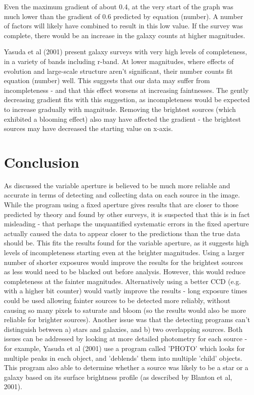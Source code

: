 \documentclass[a4paper,11pt,twoside]{article}
\begin{document}
Even the maximum gradient of about 0.4, at the very start of the graph was much lower than the gradient of 0.6 predicted by equation (number). A number of factors will likely have combined to result in this low value. If the survey was complete, there would be an increase in the galaxy counts at higher magnitudes.


Yasuda\cite{yasuda} et al (2001) present galaxy surveys with very high levels of completeness, in a variety of bands including r-band. At lower magnitudes, where effects of evolution and large-scale structure aren't significant, their number counts fit equation (number) well. 
This suggests that our data may suffer from incompleteness - and that this effect worsens at increasing faintnesses.
The gently decreasing gradient fits with this suggestion, as incompleteness would be expected to  increase gradually with magnitude.
Removing the brightest sources (which exhibited a blooming effect) also may have affected the gradient - the brightest sources may have decreased the starting value on x-axis.

\section{Conclusion}

As discussed the variable aperture is believed to be much more reliable and accurate in terms of detecting and collecting data on each source in the image.
While the program using a fixed aperture gives results that are closer to those predicted by theory and found by other surveys, it is suspected that this is in fact misleading - that perhaps the unquantified systematic errors in the fixed aperture actually caused the data to appear closer to the predictions than the true data should be.
This fits the results found for the variable aperture, as it suggests high levels of incompleteness starting even at the brighter magnitudes.
Using a larger number of shorter exposures would improve the results for the brightest sources as less would need to be blacked out before analysis. However, this would reduce completeness at the fainter magnitudes.
Alternatively using a better CCD (e.g. with a higher bit counter) would vastly improve the results - long exposure times could be used allowing fainter sources to be detected more reliably, without causing so many pixels to saturate and bloom (so the results would also be more reliable for brighter sources).
Another issue was that the detecting programs can't distinguish between a) stars and galaxies, and b) two overlapping sources. Both issues can be addressed by looking at more detailed photometry for each source - for example, Yasuda et al (2001)\cite{yasuda} use a program called 'PHOTO' which looks for multiple peaks in each object, and 'deblends' them into multiple 'child' objects. This program also able to determine whether a source was likely to be a star or a galaxy based on its surface brightness profile (as described by Blanton et al, 2001\cite{blanton}).
\end{document}
